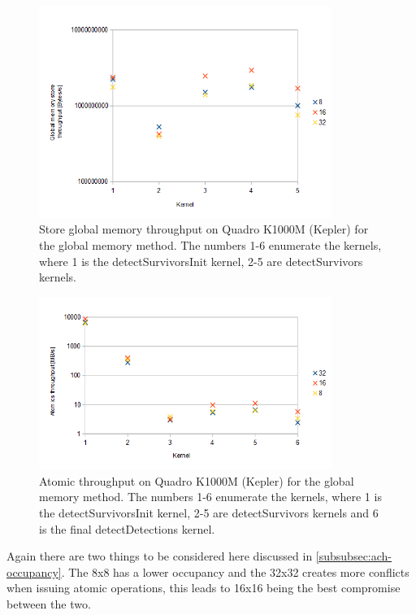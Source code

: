 \begin{figure}[h]
	\label{fig:store-g-throughput}
	\centering\includegraphics[width=0.85\textwidth]{fig/store_gthroughput_quadro.png}
	\caption{Store global memory throughput on Quadro K1000M (Kepler) for the global memory method. The numbers 1-6 enumerate the kernels, where 1 is the detectSurvivorsInit kernel, 2-5 are detectSurvivors kernels.}
\end{figure}

\begin{figure}[h]
	\label{fig:atomics-throughput}
	\centering\includegraphics[width=0.85\textwidth]{fig/atomics_throughput_quadro.png}
	\caption{Atomic throughput on Quadro K1000M (Kepler) for the global memory method. The numbers 1-6 enumerate the kernels, where 1 is the detectSurvivorsInit kernel, 2-5 are detectSurvivors kernels and 6 is the final detectDetections kernel.}
\end{figure}

Again there are two things to be considered here discussed in \ref{subsubsec:ach-occupancy}. The 8x8 has a lower occupancy and the 32x32 creates more conflicts when issuing atomic operations, this leads to 16x16 being the best compromise between the two.

